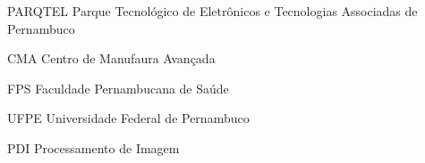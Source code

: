 \listoffigures*
\cleardoublepage


\begin{siglas}
  \item[PARQTEL] Parque Tecnológico de Eletrônicos e Tecnologias Associadas de\\Pernambuco
  \item[CMA] Centro de Manufaura Avançada
  \item[FPS] Faculdade Pernambucana de Saúde
  \item[UFPE] Universidade Federal de Pernambuco
  \item[PDI] Processamento de Imagem
\end{siglas}

